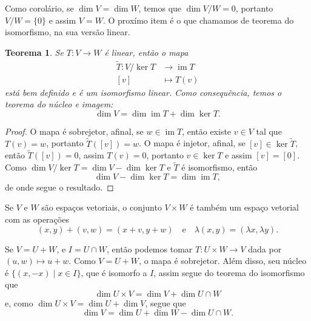 \documentclass{article}
\newtheorem{theorem}[definition]{Teorema}
\DeclareMathOperator{\im}{im}
\begin{document}
Como corolário, se $\dim V = \dim W$, temos que $\dim V/W = 0$, portanto $V/W = \{0\}$ e assim $V = W$. O proxímo item é o que chamamos de teorema do isomorfismo, na sua versão linear.

\begin{theorem}
    Se $T \colon V \to W$ é linear, então o mapa \begin{equation}
        \begin{split}
            \tilde{T} \colon V/\ker T &\to \im T \\ [v] &\mapsto T(v)
        \end{split}
    \end{equation} está bem definido e é um isomorfismo linear. Como consequência, temos o teorema do núcleo e imagem: \begin{equation*}
        \dim V = \dim \im T + \dim \ker T.
    \end{equation*}
\end{theorem}
\begin{proof}
    O mapa é sobrejetor, afinal, se $w \in \im T$, então existe $v \in V$ tal que $T(v) = w$, portanto $\tilde{T}([v]) = w$. O mapa é injetor, afinal, se $[v] \in \ker \tilde{T}$, então $\tilde{T}([v]) = 0$, assim $T(v) = 0$, portanto $v \in \ker T$ e assim $[v] = [0]$. Como $\dim V/\ker T = \dim V - \dim \ker T$ e $\tilde{T}$ é isomorfismo, então \begin{equation}
        \dim V - \dim \ker T = \dim \im T,
    \end{equation} de onde segue o resultado.
\end{proof}

Se $V$ e $W$ são espaços vetoriais, o conjunto $V \times W$ é também um espaço vetorial com as operações \begin{equation}
    (x,y) + (v,w) = (x+v, y+w) \quad \text{e} \quad \lambda(x,y) = (\lambda x, \lambda y).
\end{equation}

Se $V = U + W$, e $I = U \cap W$, então podemos tomar $T \colon U \times W \to V$ dada por $(u,w) \mapsto u+w$. Como $V = U + W$, o mapa é sobrejetor. Além disso, seu núcleo é $\{(x,-x) \mid x \in I\}$, que é isomorfo a $I$, assim segue do teorema do isomorfismo que \begin{equation}
    \dim U \times V = \dim V + \dim U \cap W
\end{equation} e, como $\dim U \times V = \dim U + \dim V$, segue que \begin{equation}
    \dim V = \dim U + \dim W - \dim U \cap W.
\end{equation}
\end{document}

